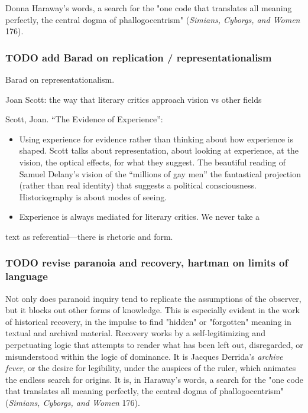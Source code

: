 \documentclass[11pt]{article}
\begin{document}
Donna Haraway's words, a search for the "one code that translates all
meaning perfectly, the central dogma of phallogocentrism" (\emph{Simians,
Cyborgs, and Women} 176).

\subsubsection{{\bfseries\sffamily TODO} add Barad on replication / representationalism}
\label{sec:org11ba0e2}

Barad on representationalism. 

Joan Scott: the way that literary critics approach vision vs other
fields

Scott, Joan. “The Evidence of Experience”:
\begin{itemize}
\item Using experience for evidence rather than thinking about how
experience is shaped. Scott talks about representation, about
looking at experience, at the vision, the optical effects, for what
they suggest. The beautiful reading of Samuel Delany’s vision of the
“millions of gay men” the fantastical projection (rather than real
identity) that suggests a political consciousness. Historiography is
about modes of seeing.
\item Experience is always mediated for literary critics. We never take a
\end{itemize}
text as referential---there is rhetoric and form.

\subsubsection{{\bfseries\sffamily TODO} revise paranoia and recovery, hartman on limits of language}
\label{sec:org145b327}

Not only does paranoid inquiry tend to replicate the assumptions of
the observer, but it blocks out other forms of knowledge. This is
especially evident in the work of historical recovery, in the impulse
to find "hidden" or "forgotten" meaning in textual and archival
material. Recovery works by a self-legitimizing and perpetuating logic
that attempts to render what has been left out, disregarded, or
misunderstood within the logic of dominance. It is Jacques Derrida's
\emph{archive fever}, or the desire for legibility, under the auspices of
the ruler, which animates the endless search for origins. It is, in
Haraway's words, a search for the "one code that translates all
meaning perfectly, the central dogma of phallogocentrism" (\emph{Simians,
Cyborgs, and Women} 176).
\end{document}
